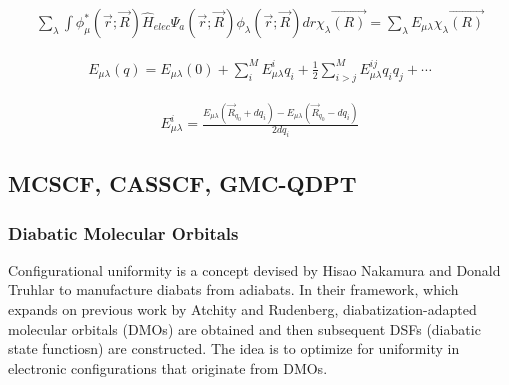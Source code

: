 \documentclass[letterpaper, 12pt, oneside]{report}
\begin{document}
\begin{equation}%
    \begin{split}
            \sum_{\lambda} \int \phi_{\mu}^{*} (\Vec{r};\Vec{R})
            \hat{H}_{elec} \Psi_{a}(\Vec{r};\Vec{R}) \phi_{\lambda} (\Vec{r};\Vec{R}) dr
            \chi_{\lambda} \Vec{(R)}
            = \sum_{\lambda} E_{\mu \lambda} \chi_{\lambda} \Vec{(R)}
    \end{split}
\end{equation}

\begin{equation} \label{eq:17}
    \begin{split}
            E_{\mu \lambda} (q) = E_{\mu \lambda} (0) + \sum_{i}^{M} E_{\mu \lambda}^{i}q_i + \frac{1}{2} 
            \sum_{i>j}^{M} E_{\mu \lambda}^{ij}q_{i}q_{j} + \cdots
    \end{split}
\end{equation}

\begin{equation} \label{eq:18}
    \begin{split}
            E_{\mu \lambda}^{i} = \frac{E_{\mu \lambda} (\Vec{R}_{q_0} + dq_{i}) - E_{\mu \lambda} (\Vec{R}_{q_0} - dq_{i})}{2dq_{i}}
    \end{split}
\end{equation}




    \subsection{MCSCF, CASSCF, GMC-QDPT}
        \subsubsection{Diabatic Molecular Orbitals}
        Configurational uniformity is a concept devised by Hisao Nakamura and Donald Truhlar to manufacture diabats from adiabats. In their framework, which expands on previous work by Atchity and Rudenberg, diabatization-adapted molecular orbitals (DMOs) are obtained and then subsequent DSFs (diabatic state functiosn) are constructed. The idea is to optimize for uniformity in electronic configurations that originate from DMOs. 
\end{document}
